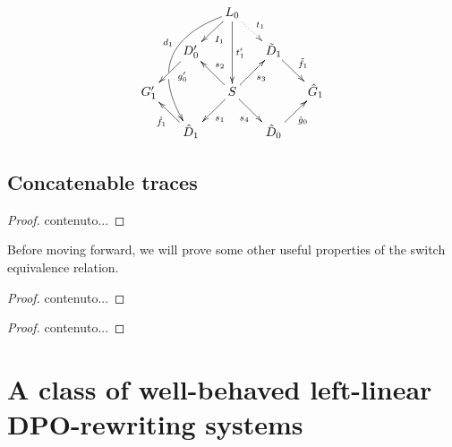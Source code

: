 \[\xymatrix@R=15pt@C=15pt{&&L_ 0\ar[dl]^{I_1} \ar@/_1.2cm/[dddl]_(.4){d_1}|(.63)\hole\ar[dd]^{t'_1} \ar@{.>}[dr]^{t_1}\\&D'_0 \ar[dl]^(.4){g'_0}&&\tilde{D}_1 \ar[dr]^{\tilde{f}_1}\\G'_1 && S\ar[dr]_{s_4} \ar[ur]_{s_3}\ar[dl]^{s_1} \ar[ul]_{s_2}&&\hat{G}_1\\& \hat{D}_1 \ar[ul]^{\hat{f}_1}&&\hat{D}_0 \ar[ur]_{\hat{g}_0}}\]







\subsection{Concatenable traces}
\begin{lemma}
\end{lemma}
\begin{proof}
	contenuto...
\end{proof}
\begin{definition}
\end{definition}

Before moving forward, we will prove some other useful properties of the switch equivalence relation.

\begin{lemma}
\end{lemma}
\begin{proof}
	contenuto...
\end{proof}


\begin{theorem}
\end{theorem}
\begin{proof}
	contenuto...
\end{proof}




\section{A class of well-behaved left-linear DPO-rewriting systems}